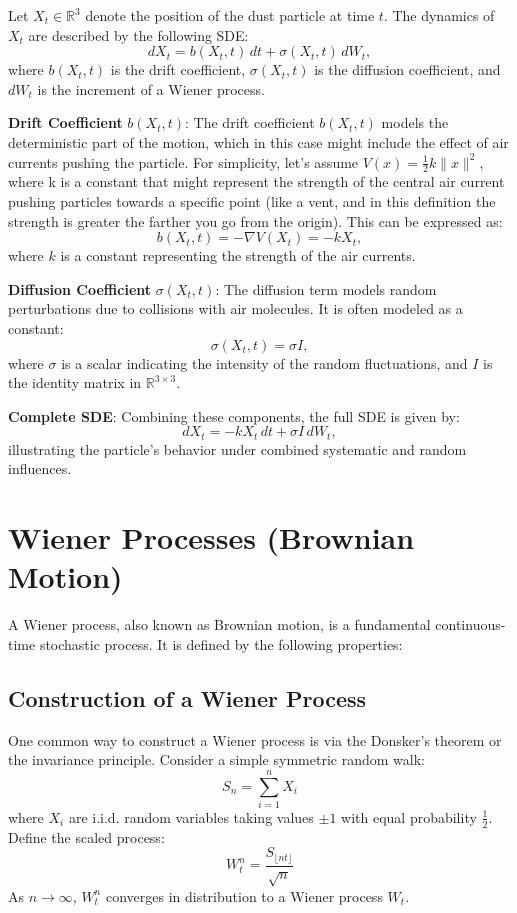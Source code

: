\documentclass[12pt]{article}
\begin{document}
Let \(X_t \in \mathbb{R}^3\) denote the position of the dust particle at time \(t\). The dynamics of \(X_t\) are described by the following SDE:
\[
dX_t = b(X_t, t) \, dt + \sigma(X_t, t) \, dW_t,
\]
where \(b(X_t, t)\) is the drift coefficient, \(\sigma(X_t, t)\) is the diffusion coefficient, and \(dW_t\) is the increment of a Wiener process.

\textbf{Drift Coefficient} \(b(X_t, t)\):
The drift coefficient \(b(X_t, t)\) models the deterministic part of the motion, which in this case might include the effect of air currents pushing the particle. For simplicity, let's assume \(V(x) = \frac{1}{2}k \|x\|^2\), where k is a constant that might represent the strength of the central air current pushing particles towards a specific point (like a vent, and in this definition the strength is greater the farther you go from the origin). This can be expressed as:
\[
b(X_t, t) = -\nabla V(X_t) = -k X_t,
\]
where \(k\) is a constant representing the strength of the air currents.

\textbf{Diffusion Coefficient} \(\sigma(X_t, t)\):
The diffusion term models random perturbations due to collisions with air molecules. It is often modeled as a constant:
\[
\sigma(X_t, t) = \sigma I,
\]
where \(\sigma\) is a scalar indicating the intensity of the random fluctuations, and \(I\) is the identity matrix in \(\mathbb{R}^{3 \times 3}\).

\textbf{Complete SDE}:
Combining these components, the full SDE is given by:
\[
dX_t = -k X_t \, dt + \sigma I \, dW_t,
\]
illustrating the particle's behavior under combined systematic and random influences.
\section{Wiener Processes (Brownian Motion)}

A Wiener process, also known as Brownian motion, is a fundamental continuous-time stochastic process. It is defined by the following properties:

\subsection{Construction of a Wiener Process}
One common way to construct a Wiener process is via the Donsker's theorem or the invariance principle. Consider a simple symmetric random walk:
\[
S_n = \sum_{i=1}^n X_i
\]
where \( X_i \) are i.i.d. random variables taking values \( \pm 1 \) with equal probability \( \frac{1}{2} \). Define the scaled process:
\[
W_t^n = \frac{S_{\lfloor nt \rfloor}}{\sqrt{n}}
\]
As \( n \to \infty \), \( W_t^n \) converges in distribution to a Wiener process \( W_t \).
\end{document}
